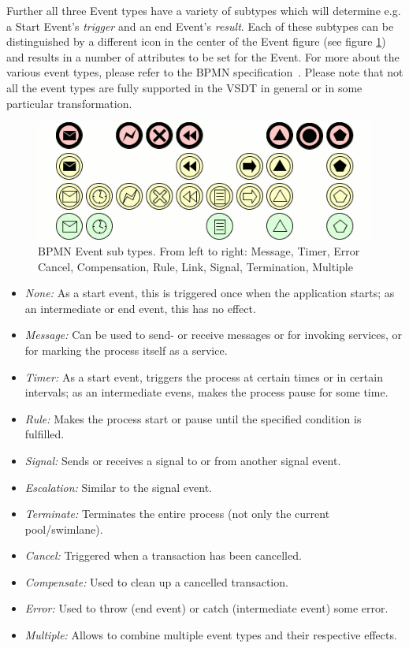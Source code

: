 Further all three Event types have a variety of subtypes which will determine
e.g. a Start Event's \emph{trigger} and an end Event's \emph{result}.  Each of
these subtypes can be distinguished by a different icon in the center of the Event
figure (see figure \ref{fig:triggers}) and results in a number of attributes to
be set for the Event. For more about the various event types, please refer to the
BPMN specification~\cite{omg2011bpmn2}. Please note that not all the event types
are fully supported in the VSDT in general or in some particular transformation.

\begin{figure}[ht]
	\centering
	\includegraphics[width=.75\textwidth]{figures/bpmn/triggers.png}
	\caption[BPMN Event sub types]{BPMN Event sub types.  From left to right:
	Message, Timer, Error Cancel, Compensation, Rule, Link, Signal, Termination,
	Multiple}
	\label{fig:triggers}
\end{figure}

\begin{itemize}
	\item \emph{None:} As a start event, this is triggered once when the application starts; as an intermediate or end event, this has no effect.
	\item \emph{Message:} Can be used to send- or receive messages or for invoking services, or for marking the process itself as a service.
	\item \emph{Timer:} As a start event, triggers the process at certain times or in certain intervals; as an intermediate evens, makes the process pause for some time.
	\item \emph{Rule:} Makes the process start or pause until the specified condition is fulfilled.
	\item \emph{Signal:} Sends or receives a signal to or from another signal event.
	\item \emph{Escalation:} Similar to the signal event.
	\item \emph{Terminate:} Terminates the entire process (not only the current pool/swimlane).
	\item \emph{Cancel:} Triggered when a transaction has been cancelled.
	\item \emph{Compensate:} Used to clean up a cancelled transaction.
	\item \emph{Error:} Used to throw (end event) or catch (intermediate event) some error.
	\item \emph{Multiple:} Allows to combine multiple event types and their respective effects.
\end{itemize}


